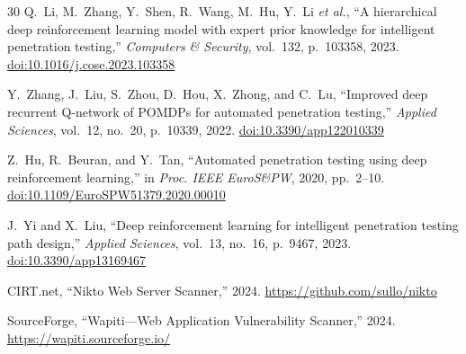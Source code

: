 \documentclass[a4paper,12pt]{article}
\begin{document}
\begin{thebibliography}{30}
 Q.~Li, M.~Zhang, Y.~Shen, R.~Wang, M.~Hu, Y.~Li \emph{et al.}, ``A hierarchical deep reinforcement learning model with expert prior knowledge for intelligent penetration testing,'' \emph{Computers \& Security}, vol.~132, p.~103358, 2023. \href{https://doi.org/10.1016/j.cose.2023.103358}{doi:10.1016/j.cose.2023.103358}

 Y.~Zhang, J.~Liu, S.~Zhou, D.~Hou, X.~Zhong, and C.~Lu, ``Improved deep recurrent Q-network of POMDPs for automated penetration testing,'' \emph{Applied Sciences}, vol.~12, no.~20, p.~10339, 2022. \href{https://doi.org/10.3390/app122010339}{doi:10.3390/app122010339}

 Z.~Hu, R.~Beuran, and Y.~Tan, ``Automated penetration testing using deep reinforcement learning,'' in \emph{Proc. IEEE EuroS\&PW}, 2020, pp.~2--10. \href{https://doi.org/10.1109/EuroSPW51379.2020.00010}{doi:10.1109/EuroSPW51379.2020.00010}

 J.~Yi and X.~Liu, ``Deep reinforcement learning for intelligent penetration testing path design,'' \emph{Applied Sciences}, vol.~13, no.~16, p.~9467, 2023. \href{https://doi.org/10.3390/app13169467}{doi:10.3390/app13169467}

 CIRT.net, ``Nikto Web Server Scanner,'' 2024. \url{https://github.com/sullo/nikto}

 SourceForge, ``Wapiti---Web Application Vulnerability Scanner,'' 2024. \url{https://wapiti.sourceforge.io/}

\end{thebibliography}
\end{document}
